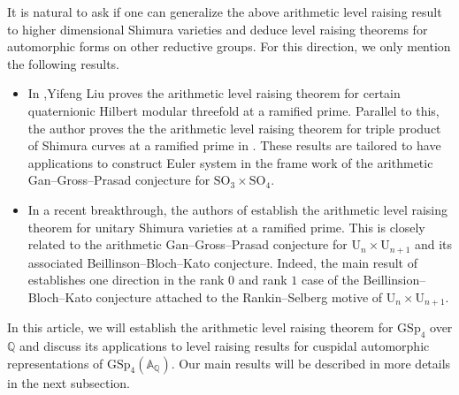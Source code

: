 \documentclass[10pt]{amsart}
\numberwithin{equation}{section}
\theoremstyle{definition}
\def\GSp{\mathrm{GSp}}
\def\SO{\mathrm{SO}}
\def\QQ{\mathbb{Q}}
\def\rmU{\mathrm{U}}
\begin{document}
It is natural to ask if one can generalize the above arithmetic level raising result to higher dimensional Shimura varieties and deduce level raising theorems for automorphic forms on other reductive groups. For this direction, we only mention the following results.
\begin{itemize}
\item In \cite{Liu-cubic},Yifeng Liu proves the arithmetic level raising theorem  for certain quaternionic Hilbert modular threefold at a ramified prime. Parallel to this, the author proves the the arithmetic level raising theorem for triple product of Shimura curves at a ramified prime in \cite{Wangd}. These results are tailored to have applications to construct Euler system in the frame work of the arithmetic Gan--Gross--Prasad conjecture for $\SO_{3}\times\SO_{4}$. 
\item In a recent breakthrough, the authors of \cite{LTXZZ} establish the arithmetic level raising theorem for unitary Shimura varieties at a ramified prime. This is closely related to the arithmetic Gan--Gross--Prasad conjecture for  $\rmU_{n}\times\rmU_{n+1}$ and its associated Beillinson--Bloch--Kato conjecture. Indeed, the main result of \cite{LTXZZ} establishes one direction in the rank $0$ and rank $1$ case of the Beillinsion--Bloch--Kato conjecture attached to the Rankin--Selberg motive of $\rmU_{n}\times\rmU_{n+1}$.
\end{itemize}
In this article, we will establish the arithmetic level raising theorem for $\GSp_{4}$ over $\QQ$ and discuss its applications to level raising results for cuspidal automorphic representations of  $\GSp_{4}(\mathbb{A}_{\QQ})$. Our main results will be described in more details in the next subsection.
 
\end{document}
